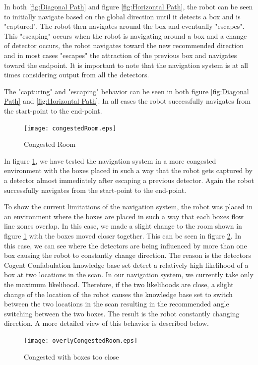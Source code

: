 \documentclass[journal]{IEEEtran}
\begin{document}
In both \ref{fig:Diagonal Path} and figure \ref{fig:Horizontal Path}, the robot can be seen to initially navigate based on the global direction until it detects a box and is "captured".
The robot then navigates around the box and eventually "escapes".
This "escaping" occurs when the robot is navigating around a box and a change of detector occurs,
the robot navigates toward the new recommended direction
and in most cases "escapes" the attraction of the previous box and navigates toward the endpoint.
It is important to note that the navigation system is at all times considering output from all the detectors.

The "capturing" and "escaping" behavior can be seen in both figure \ref{fig:Diagonal Path} and \ref{fig:Horizontal Path}.
In all cases the robot successfully navigates from the start-point to the end-point.

\begin{figure}[!t]
\centerline{
\mbox{\texttt{[image: congestedRoom.eps]}}
}
\caption{Congested Room}
\label{fig:Congested Room}
\end{figure}

In figure \ref{fig:Congested Room}, we have tested the navigation system in a more congested environment with the boxes placed in such a way that
the robot gets captured by a detector almost immediately after escaping a previous detector. Again the
robot successfully navigates from the start-point to the end-point.

To show the current limitations of the navigation system, the robot was placed in an environment
where the boxes are placed in such a way that each boxes flow line zones overlap.
In this case, we made a slight change to the room shown in figure \ref{fig:Congested Room} with the boxes moved closer together.
This can be seen in figure \ref{fig:Congested with boxes too close}.
In this case, we can see where the detectors are being influenced by more than one box causing the robot to constantly change direction.
The reason is the detectors Cogent Confabulation knowledge base set detect a relatively high likelihood of a box at two locations in the scan.
In our navigation system, we currently take only the maximum likelihood. Therefore, if the two likelihoods are close, a slight change of the location of the robot
causes the knowledge base set to switch between the two locations in the scan resulting in the recommended angle switching between the two boxes.
The result is the robot constantly changing direction.
A more detailed view of this behavior is described below.
\begin{figure}[!t]
\centerline{
\mbox{\texttt{[image: overlyCongestedRoom.eps]}}
}
\caption{Congested with boxes too close}
\label{fig:Congested with boxes too close}
\end{figure}
\end{document}
